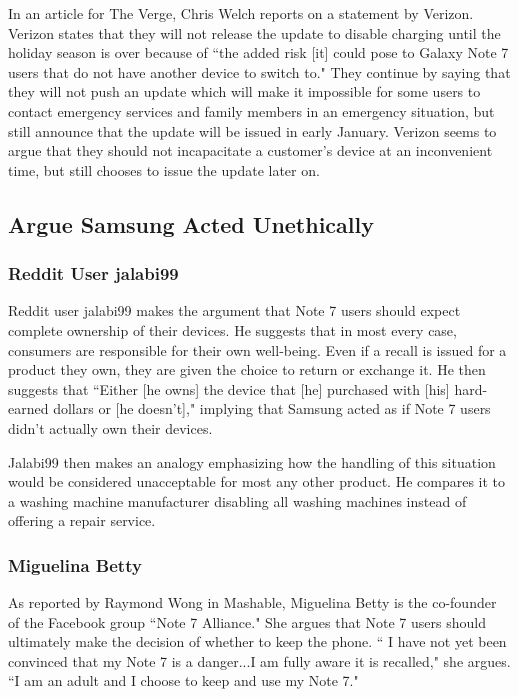 \documentclass[12pt]{article}
\begin{document}
      In an article for The Verge, Chris Welch reports on a statement by Verizon.\cite{verizonPressRelease} Verizon states that they will not release the update to disable charging until the holiday season is over because of ``the added risk [it] could pose to Galaxy Note 7 users that do not have another device to switch to." They continue by saying that they will not push an update which will make it impossible for some users to contact emergency services and family members in an emergency situation, but still announce that the update will be issued in early January. Verizon seems to argue that they should not incapacitate a customer's device at an inconvenient time, but still chooses to issue the update later on\cite{verizonPressRelease}.
   
   \subsection{Argue Samsung Acted Unethically}
   
   \subsubsection{Reddit User jalabi99}
      Reddit user jalabi99 makes the argument that Note 7 users should expect complete ownership of their devices\cite{redditJalabi99ArgueUnethical}. He suggests that in most every case, consumers are responsible for their own well-being. Even if a recall is issued for a product they own, they are given the choice to return or exchange it. He then suggests that ``Either [he owns] the device that [he] purchased with [his] hard-earned dollars or [he doesn't]," implying that Samsung acted as if Note 7 users didn't actually own their devices\cite{redditJalabi99ArgueUnethical}.
      
      Jalabi99 then makes an analogy emphasizing how the handling of this situation would be considered unacceptable for most any other product. He compares it to a washing machine manufacturer disabling all washing machines instead of offering a repair service\cite{redditJalabi99ArgueUnethical}.
      
      
   \subsubsection{Miguelina Betty}
      As reported by Raymond Wong in Mashable, Miguelina Betty is the co-founder of the Facebook group ``Note 7 Alliance." She argues that Note 7 users should ultimately make the decision of whether to keep the phone\cite{mashableMiguelinaBetty}. `` I have not yet been convinced that my Note 7 is a danger...I am fully aware it is recalled," she argues. ``I am an adult and I choose to keep and use my Note 7."
      
\end{document}
